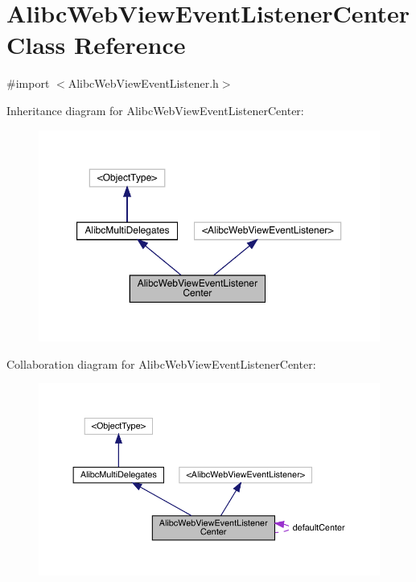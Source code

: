 \hypertarget{interface_alibc_web_view_event_listener_center}{}\section{Alibc\+Web\+View\+Event\+Listener\+Center Class Reference}
\label{interface_alibc_web_view_event_listener_center}


{\ttfamily \#import $<$Alibc\+Web\+View\+Event\+Listener.\+h$>$}



Inheritance diagram for Alibc\+Web\+View\+Event\+Listener\+Center\+:\nopagebreak
\begin{figure}[H]
\begin{center}
\leavevmode
\includegraphics[width=350pt]{interface_alibc_web_view_event_listener_center__inherit__graph}
\end{center}
\end{figure}


Collaboration diagram for Alibc\+Web\+View\+Event\+Listener\+Center\+:\nopagebreak
\begin{figure}[H]
\begin{center}
\leavevmode
\includegraphics[width=350pt]{interface_alibc_web_view_event_listener_center__coll__graph}
\end{center}
\end{figure}
